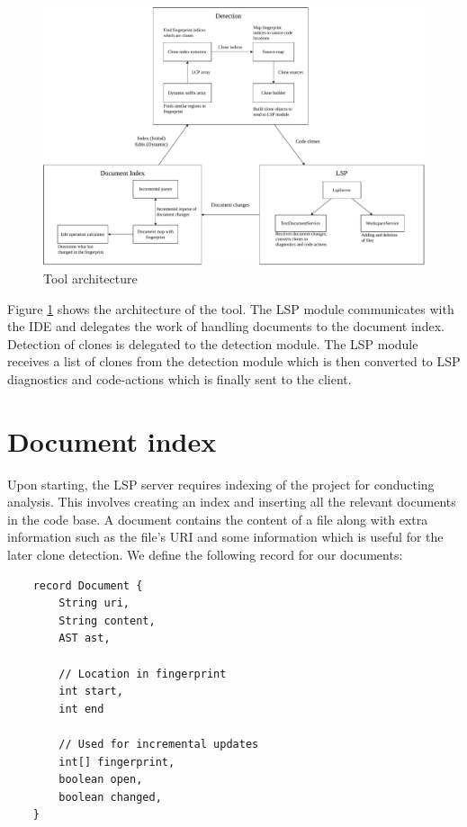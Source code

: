 \begin{figure}
	\includegraphics[width=\textwidth]{figures/architecture.drawio.pdf}
	\caption{Tool architecture}
	\label{fig:architecture}
\end{figure}

Figure \ref{fig:architecture} shows the architecture of the tool. The LSP module
communicates with the IDE and delegates the work of handling documents to the document
index. Detection of clones is delegated to the detection module. The LSP module receives a
list of clones from the detection module which is then converted to LSP diagnostics and
code-actions which is finally sent to the client.

\section{Document index}

Upon starting, the LSP server requires indexing of the project for conducting analysis.
This involves creating an index and inserting all the relevant documents in the code base.
A document contains the content of a file along with extra information such as the file's
URI and some information which is useful for the later clone detection. We define the
following record for our documents:

\begin{lstlisting}
    record Document {
        String uri,
        String content,
        AST ast,

        // Location in fingerprint
        int start,
        int end

        // Used for incremental updates
        int[] fingerprint,
        boolean open,
        boolean changed,
    }
\end{lstlisting}

